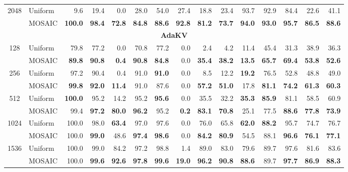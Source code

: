 \begin{table}[tp]
\begin{tabular}{@{} c l rrrrrrrrrrrrr @{}}
    \cmidrule(l){1-15}
    \multirow{2}{*}{2048} & Uniform & 9.6 & 19.4 & 0.0 & 28.0 & 54.0 & 27.4 & 18.8 & 23.4 & 93.7 & 92.9 & 84.4 & 22.6 & 41.1 \\
     & MOSAIC & \textbf{100.0} & \textbf{98.4} & \textbf{72.8} & \textbf{84.8} & \textbf{88.6} & \textbf{92.8} & \textbf{81.2} & \textbf{73.7} & \textbf{94.0} & \textbf{93.0} & \textbf{95.7} & \textbf{86.5} & \textbf{88.6} \\
    \midrule
    \multicolumn{15}{c}{\textbf{AdaKV}} \\
    \midrule
    \multirow{2}{*}{128} & Uniform & 79.8 & 77.2 & 0.0 & 70.8 & 77.2 & 0.0 & 2.4 & 4.2 & 11.4 & 45.4 & 31.3 & 38.9 & 36.3 \\
     & MOSAIC & \textbf{89.8} & \textbf{90.8} & \textbf{0.4} & \textbf{90.8} & \textbf{84.8} & 0.0 & \textbf{35.4} & \textbf{38.2} & \textbf{13.5} & \textbf{65.7} & \textbf{69.4} & \textbf{53.8} & \textbf{52.6} \\
    \cmidrule(l){1-15}
    \multirow{2}{*}{256} & Uniform & 97.2 & 90.4 & 0.4 & 91.0 & \textbf{91.0} & 0.0 & 8.5 & 12.2 & \textbf{19.2} & 76.5 & 52.8 & 48.8 & 49.0 \\
     & MOSAIC & \textbf{99.8} & \textbf{92.0} & \textbf{11.4} & 91.0 & 87.6 & 0.0 & \textbf{57.2} & \textbf{51.0} & 17.8 & \textbf{81.1} & \textbf{74.2} & \textbf{61.3} & \textbf{60.3} \\
    \cmidrule(l){1-15}
    \multirow{2}{*}{512} & Uniform & \textbf{100.0} & 95.2 & 14.2 & 95.2 & \textbf{95.6} & 0.0 & 35.5 & 32.2 & \textbf{35.3} & \textbf{85.9} & 81.1 & 58.5 & 60.9 \\
     & MOSAIC & 99.4 & \textbf{97.2} & \textbf{80.0} & \textbf{96.2} & 95.2 & \textbf{0.2} & \textbf{83.1} & \textbf{70.8} & 25.1 & 77.5 & \textbf{88.6} & \textbf{77.8} & \textbf{73.9} \\
    \cmidrule(l){1-15}
    \multirow{2}{*}{1024} & Uniform & 100.0 & 98.0 & \textbf{63.4} & 97.0 & 97.6 & 0.0 & 76.0 & 65.8 & \textbf{62.0} & \textbf{88.2} & 95.7 & 74.7 & 76.7 \\
     & MOSAIC & 100.0 & \textbf{99.0} & 48.6 & \textbf{97.4} & \textbf{98.6} & 0.0 & \textbf{84.2} & \textbf{80.9} & 54.5 & 88.1 & \textbf{96.6} & \textbf{76.1} & \textbf{77.1} \\
    \cmidrule(l){1-15}
    \multirow{2}{*}{1536} & Uniform & 100.0 & 99.0 & 84.2 & 97.2 & 98.8 & 1.4 & 89.0 & 83.0 & 79.6 & 89.7 & 97.6 & 81.6 & 83.6 \\
     & MOSAIC & 100.0 & \textbf{99.6} & \textbf{92.6} & \textbf{97.8} & \textbf{99.6} & \textbf{19.0} & \textbf{96.2} & \textbf{90.8} & \textbf{88.6} & 89.7 & \textbf{97.7} & \textbf{86.9} & \textbf{88.3} \\

\end{tabular}
\end{table}
